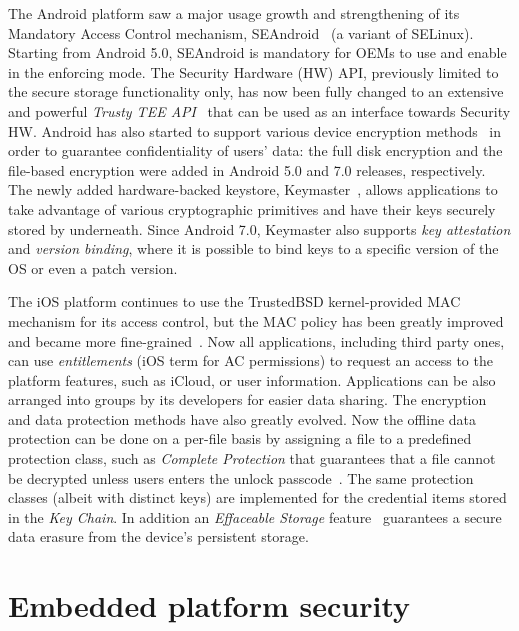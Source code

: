 The Android platform saw a major usage growth and strengthening of its Mandatory Access Control mechanism, SEAndroid~\cite{smalley12} (a variant of SELinux). Starting from Android 5.0, SEAndroid is mandatory for OEMs to use and enable in the enforcing mode. The Security Hardware (HW) API, previously limited to the secure storage functionality only, has now been fully changed to an extensive and powerful \textit{Trusty TEE API}~\cite{trusty} that can be used as an interface towards Security HW. Android has also started to support various device encryption methods~\cite{androidencr} in order to guarantee confidentiality of users' data: the full disk encryption and the file-based encryption were added in Android 5.0 and 7.0 releases, respectively. The newly added hardware-backed keystore, Keymaster~\cite{androidkeymaster}, allows applications to take advantage of various cryptographic primitives and have their keys securely stored by underneath. Since Android 7.0, Keymaster also supports \textit{key attestation} and \textit{version binding}, where it is possible to bind keys to a specific version of the OS or even a patch version. 

The iOS platform continues to use the TrustedBSD kernel-provided MAC mechanism for its access control, but the MAC policy has been greatly improved and became more fine-grained~\cite{iOS11}.  Now all applications, including third party ones, can use \textit{entitlements} (iOS term for AC permissions) to request an access to the platform features, such as iCloud, or user information. Applications can be also arranged into groups by its developers for easier data sharing. The encryption and data protection methods have also greatly evolved. Now the offline data protection can be done on a per-file basis by assigning a file to a predefined protection class, such as \textit{Complete Protection} that guarantees that a file cannot be decrypted unless users enters the unlock passcode~\cite{iOS11}. The same protection classes (albeit with distinct keys) are implemented for the credential items stored in the \textit{Key Chain}. In addition an \textit{Effaceable Storage} feature~\cite{iOS11} guarantees a secure data erasure from the device's persistent storage. 

\section{Embedded platform security}

